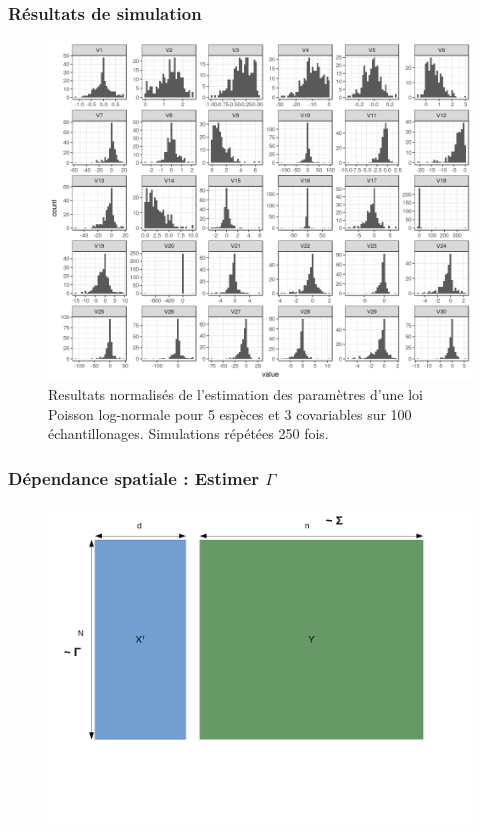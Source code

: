 \documentclass[11pt,table]{beamer}
\begin{document}
\begin{frame}
\frametitle{Résultats de simulation}
\begin{figure}
\includegraphics[scale=0.3]{graph53_st_DIRETC_L.png}
\caption{Resultats normalisés de l'estimation des paramètres d'une loi Poisson log-normale pour 5 espèces et 3 covariables sur 100 échantillonages. Simulations répétées 250 fois. }
\end{figure}
\end{frame}




\begin{frame}
\frametitle{Dépendance spatiale : Estimer $\Gamma$}
\begin{figure}
\includegraphics[scale=0.3]{Dependance_2.pdf}
\end{figure}
\end{frame}
\end{document}
